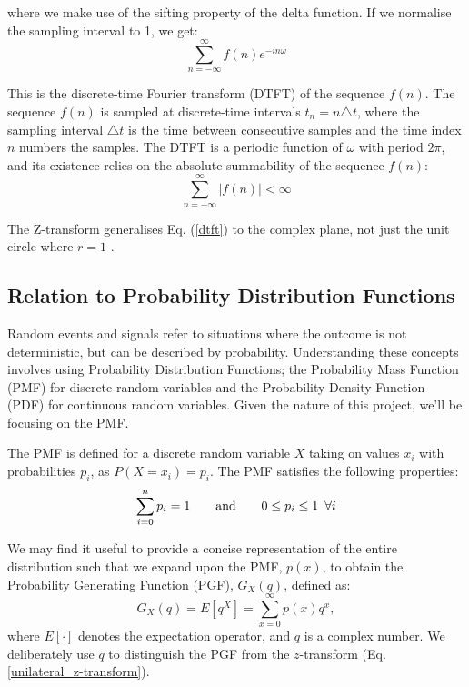 \documentclass[a4paper]{report}
\begin{document}
where we make use of the sifting property of the delta function. If we normalise the sampling interval to 1, we get:
\begin{equation}\label{dtft}
\sum^{\infty}_{n = - \infty} f(n)e^{-i n \omega}
\end{equation}

This is the discrete-time Fourier transform (DTFT) of the sequence $f(n)$. The sequence $f(n)$ is sampled at discrete-time intervals $t_n = n \triangle t$, where the sampling interval $\triangle t$ is the time between consecutive samples and the time index $n$ numbers the samples. The DTFT is a periodic function of $\omega$ with period $2\pi$, and its existence relies on the absolute summability of the sequence $f(n)$:
\begin{equation}
\sum^{\infty}_{n = -\infty} |f(n)| < \infty
\end{equation}

The Z-transform generalises Eq. (\ref{dtft}) to the complex plane, not just the unit circle where $r = 1$ \citep{Oppenheim1989DTSP}.

\subsection{Relation to Probability Distribution Functions}\label{pdfs}
Random events and signals refer to situations where the outcome is not deterministic, but can be described by probability. Understanding these concepts involves using Probability Distribution Functions; the Probability Mass Function (PMF) for discrete random variables and the Probability Density Function (PDF) for continuous random variables. Given the nature of this project, we'll be focusing on the PMF.

The PMF is defined for a discrete random variable $X$ taking on values $x_i$ with probabilities $p_i$, as $P(X=x_i) = p_i$. The PMF satisfies the following properties:
\begin{equation}
    \sum_{i=0}^n p_i = 1 \hspace{2em}\text{and}\hspace{2em} 0 \leq p_i \leq 1 \hspace{0.5em}\forall i
\end{equation}

We may find it useful to provide a concise representation of the entire distribution such that we expand upon the PMF, $p(x)$, to obtain the Probability Generating Function (PGF), $G_X(q)$, defined as:
\begin{equation}
	G_X(q) = E[q^X] = \sum^{\infty}_{x = 0} p(x)q^x,
\end{equation}
where $E[\cdot]$ denotes the expectation operator, and $q$ is a complex number. We deliberately use $q$ to distinguish the PGF from the $z$-transform (Eq. \ref{unilateral_z-transform}).
\end{document}
